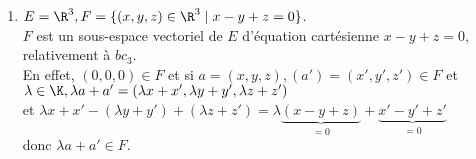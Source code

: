 \documentclass[12pt, a4paper]{report}
\begin{document}
\begin{exemple}[Exemples]
\begin{enumerate}
	\item $E = \R^3, F = \{(x,y,z) \in \R^3 \mid x-y+z=0 \}$. \\
	$F$ est un sous-espace vectoriel de $E$ d'équation cartésienne $x-y+z = 0$, relativement à $bc_3$. \\
	En effet, $(0,0,0) \in F$ et si $a = (x,y,z), (a') = (x',y',z') \in F$ et \\
	$\lambda \in \K, \lambda a + a' = (\lambda x + x', \lambda y + y', \lambda z + z')$ \\
	et $\lambda x + x' - (\lambda y + y') + (\lambda z + z') = \lambda \underbrace{(x-y+z)}_{=0} + \underbrace{x'-y'+z'}_{=0}$ \\
	donc $\lambda a + a' \in F$.
	
\end{enumerate}
\end{exemple}
\end{document}

